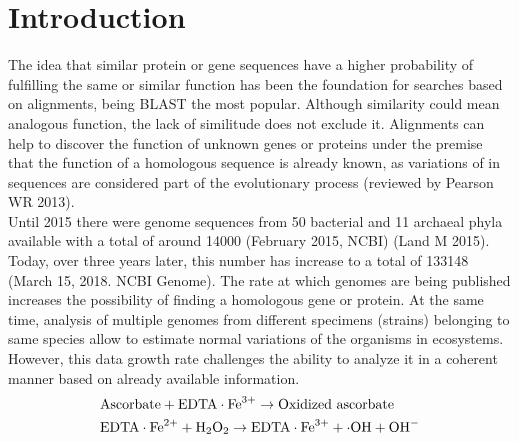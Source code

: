 \documentclass[a4,center,fleqn]{NAR}
\begin{document}
\section{Introduction}

The idea that similar protein or gene sequences have a higher probability of fulfilling the same or similar function has been the foundation for searches based on alignments, being BLAST the most popular. Although similarity could mean analogous function, the lack of similitude does not exclude it. Alignments can help to discover the function of unknown genes or proteins under the premise that the function of a homologous sequence is already known, as variations of in sequences are considered part of the evolutionary process (reviewed by Pearson WR 2013).\\
Until 2015 there were genome sequences from 50 bacterial and 11 archaeal phyla available with a total of around 14000 (February 2015, NCBI) (Land M 2015). Today, over three years later,  this number has increase to a total of 133148 (March 15, 2018. NCBI Genome). The rate at which genomes are being published increases the possibility of finding a homologous gene or protein. At the same time, analysis of multiple genomes from different specimens (strains) belonging to same species allow to estimate normal variations of the organisms in ecosystems. However, this data growth rate challenges the ability to analyze it in a coherent manner based on already available information.\\	 


\begin{align*}
&\mathrm{Ascorbate} + \mathrm{EDTA} \cdot \mathrm{Fe}^{3+} \to
\hbox{Oxidized ascorbate}
\\
&\mathrm{EDTA} \cdot \mathrm{Fe}^{2+} + \mathrm{H}_2
\mathrm{O}_2 \to
\mathrm{EDTA} \cdot \mathrm{Fe}^{3+} + \cdot
\mathrm{OH} + \mathrm{OH}^-
\end{align*}
\end{document}
